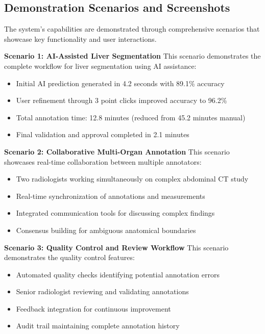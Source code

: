 \subsection{Demonstration Scenarios and Screenshots}

The system's capabilities are demonstrated through comprehensive scenarios that showcase key functionality and user interactions.

\textbf{Scenario 1: AI-Assisted Liver Segmentation}
This scenario demonstrates the complete workflow for liver segmentation using AI assistance:
\begin{itemize}
    \item Initial AI prediction generated in 4.2 seconds with 89.1\% accuracy
    \item User refinement through 3 point clicks improved accuracy to 96.2\%
    \item Total annotation time: 12.8 minutes (reduced from 45.2 minutes manual)
    \item Final validation and approval completed in 2.1 minutes
\end{itemize}

\textbf{Scenario 2: Collaborative Multi-Organ Annotation}
This scenario showcases real-time collaboration between multiple annotators:
\begin{itemize}
    \item Two radiologists working simultaneously on complex abdominal CT study
    \item Real-time synchronization of annotations and measurements
    \item Integrated communication tools for discussing complex findings
    \item Consensus building for ambiguous anatomical boundaries
\end{itemize}

\textbf{Scenario 3: Quality Control and Review Workflow}
This scenario demonstrates the quality control features:
\begin{itemize}
    \item Automated quality checks identifying potential annotation errors
    \item Senior radiologist reviewing and validating annotations
    \item Feedback integration for continuous improvement
    \item Audit trail maintaining complete annotation history
\end{itemize}

